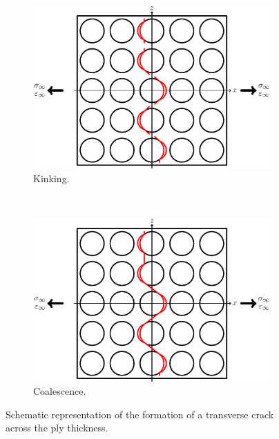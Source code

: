 \begin{figure}[!h]
   \begin{subfigure}[b]{0.45\textwidth}
        \includegraphics[width=\textwidth]{pics/stage3-kinking.pdf}
       \caption{Kinking.}
    \end{subfigure}
    ~
    \begin{subfigure}[b]{0.45\textwidth}
        \includegraphics[width=\textwidth]{pics/stage4-coalescence.pdf}
       \caption{Coalescence.}
    \end{subfigure}

\caption{Schematic representation of the formation of a transverse crack across the ply thickness.}\label{intro:fig:schematic-transversecracks}
\end{figure}

